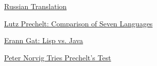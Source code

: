             
            
              
            
            
              
                
              
              
              
                \href{http://www.melikyan.com/dalshe/articles/power.html}{Russian Translation}


              
            
            
              
            
            
              
            
            
              
                
              
              
              
                \href{http://wwwipd.ira.uka.de/\textasciitilde{}prechelt/Biblio/jccpprtTR.pdf}{Lutz Prechelt: Comparison of Seven Languages}


              
            
            
              
            
            
              
            
            
              
                
              
              
              
                \href{http://www.flownet.com/gat/papers/lisp-java.pdf}{Erann Gat: Lisp vs. Java}


              
            
            
              
            
            
              
            
            
              
                
              
              
              
                \href{http://www.norvig.com/java-lisp.html}{Peter Norvig Tries Prechelt's Test}


              
            
            
              
            
            
              
            
